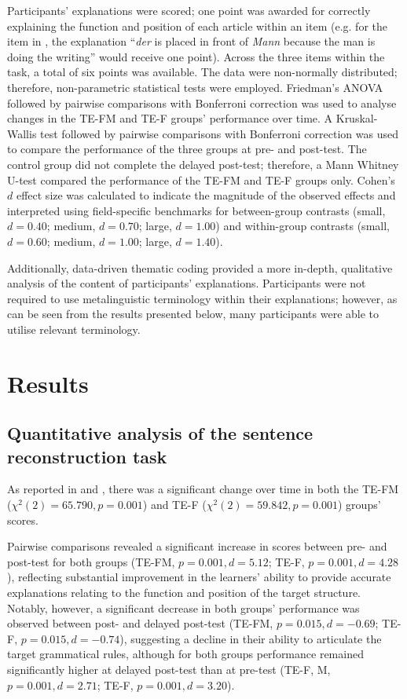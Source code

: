 \documentclass[output=paper]{langscibook}
\begin{document}
Participants’ explanations were scored; one point was awarded for correctly explaining the function and position of each article within an item (e.g. for the item in , the explanation “\textit{der} is placed in front of \textit{Mann} because the man is doing the writing” would receive one point). Across the three items within the task, a total of six points was available. The data were non-normally distributed; therefore, non-parametric statistical tests were employed. Friedman’s ANOVA followed by pairwise comparisons with Bonferroni correction was used to analyse changes in the TE-FM and TE-F groups’ performance over time. A Kruskal-Wallis test followed by pairwise comparisons with Bonferroni correction was used to compare the performance of the three groups at pre- and post-test. The control group did not complete the delayed post-test; therefore, a Mann Whitney U-test compared the performance of the TE-FM and TE-F groups only. Cohen’s~$d$ effect size was calculated to indicate the magnitude of the observed effects and interpreted using  field-specific benchmarks for between-group contrasts (small, $d = 0.40$; medium, $d = 0.70$; large, $d = 1.00$) and within-group contrasts (small, $d = 0.60$; medium, $d = 1.00$; large, $d = 1.40$).

Additionally, data-driven thematic coding provided a more in-depth, qualitative analysis of the content of participants’ explanations. Participants were not required to use metalinguistic terminology within their explanations; however, as can be seen from the results presented below, many participants were able to utilise relevant terminology. 

\section{Results}
\subsection{Quantitative analysis of the sentence reconstruction task}

As reported in \citet{Hanan2015} and \citet{KasprowiczMarsden2018}, there was a significant change over time in both the TE-FM ($\chi^2 (2) = 65.790,\allowbreak p = 0.001$) and TE-F ($\chi^2(2) = 59.842,\allowbreak p = 0.001$) groups’ scores.

Pairwise comparisons revealed a significant increase in scores between pre- and post-test for both groups (TE-FM, $ p = 0.001,\allowbreak d =5.12$; TE-F, $p = 0.001,\allowbreak d = 4.28$), reflecting substantial improvement in the learners’ ability to provide accurate explanations relating to the function and position of the target structure. Notably, however, a significant decrease in both groups’ performance was observed between post- and delayed post-test (TE-FM, $ p=0.015,\allowbreak d = -0.69$; TE-F, $p=0.015,\allowbreak d=-0.74$), suggesting a decline in their ability to articulate the target grammatical rules, although for both groups performance remained significantly higher at delayed post-test than at pre-test (TE-F, M, $p=0.001,\allowbreak d = 2.71$; TE-F, $p = 0.001,\allowbreak d =3.20$).
\end{document}
